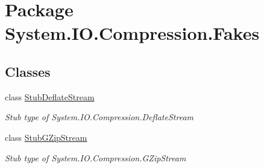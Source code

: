 \hypertarget{namespace_system_1_1_i_o_1_1_compression_1_1_fakes}{\section{Package System.\-I\-O.\-Compression.\-Fakes}
\label{namespace_system_1_1_i_o_1_1_compression_1_1_fakes}
}
\subsection*{Classes}
\begin{DoxyCompactItemize}
\item 
class \hyperlink{class_system_1_1_i_o_1_1_compression_1_1_fakes_1_1_stub_deflate_stream}{Stub\-Deflate\-Stream}
\begin{DoxyCompactList}\small\item\em Stub type of System.\-I\-O.\-Compression.\-Deflate\-Stream\end{DoxyCompactList}\item 
class \hyperlink{class_system_1_1_i_o_1_1_compression_1_1_fakes_1_1_stub_g_zip_stream}{Stub\-G\-Zip\-Stream}
\begin{DoxyCompactList}\small\item\em Stub type of System.\-I\-O.\-Compression.\-G\-Zip\-Stream\end{DoxyCompactList}\end{DoxyCompactItemize}
